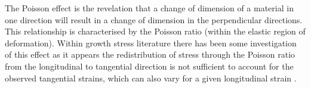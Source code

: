 The Poisson effect is the revelation that a change of dimension of a material
in one direction will result in a change of dimension in the perpendicular directions.
This relationship is characterised by the Poisson ratio (within the elastic
region of deformation). Within growth stress literature there has been some
investigation of this effect as it appears the redistribution of stress through
the Poisson ratio from the longitudinal to tangential direction is not
sufficient to account for the observed tangential strains, which can also vary
for a given longitudinal strain \citep{kubler_1987}.